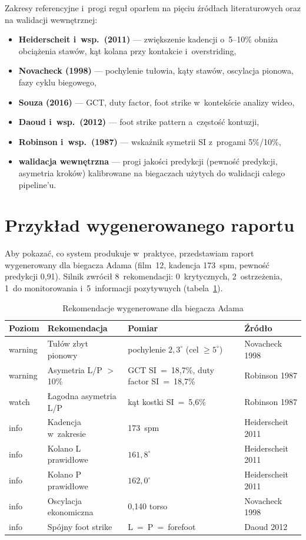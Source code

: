 Zakresy referencyjne i~progi reguł oparłem na pięciu źródłach literaturowych oraz na walidacji wewnętrznej:
\begin{itemize}
    \item \textbf{Heiderscheit i~wsp.\ (2011)} \cite{heiderscheit2011} --- zwiększenie kadencji o~5--10\% obniża obciążenia stawów, kąt kolana przy kontakcie i~overstriding,
    \item \textbf{Novacheck (1998)} \cite{novacheck1998} --- pochylenie tułowia, kąty stawów, oscylacja pionowa, fazy cyklu biegowego,
    \item \textbf{Souza (2016)} \cite{souza2016} --- GCT, duty factor, foot strike w~kontekście analizy wideo,
    \item \textbf{Daoud i~wsp.\ (2012)} \cite{daoud2012} --- foot strike pattern a~częstość kontuzji,
    \item \textbf{Robinson i~wsp.\ (1987)} \cite{robinson1987} --- wskaźnik symetrii SI z~progami 5\%/10\%,
    \item \textbf{walidacja wewnętrzna} --- progi jakości predykcji (pewność predykcji, asymetria kroków) kalibrowane na biegaczach użytych do walidacji całego pipeline'u.
\end{itemize}
\newpage
\section{Przykład wygenerowanego raportu}
\label{sec:rules-example}

Aby pokazać, co system produkuje w~praktyce, przedstawiam raport wygenerowany dla biegacza Adama (film~12, kadencja 173~spm, pewność predykcji 0{,}91). Silnik zwrócił 8~rekomendacji: 0~krytycznych, 2~ostrzeżenia, 1~do monitorowania i~5~informacji pozytywnych (tabela~\ref{tab:rec-example}).

\begin{table}[H]
\centering
\caption{Rekomendacje wygenerowane dla biegacza Adama}
\label{tab:rec-example}
\small
\begin{tabular}{p{1.6cm}p{4.3cm}p{4.2cm}p{2.4cm}}
\hline
\textbf{Poziom} & \textbf{Rekomendacja} & \textbf{Pomiar} & \textbf{Źródło} \\
\hline
warning & Tułów zbyt pionowy & pochylenie $2{,}3^\circ$ (cel $\geq 5^\circ$) & Novacheck 1998 \\
warning & Asymetria L/P $>$10\% & GCT SI~=~18{,}7\%, duty factor SI~=~18{,}7\% & Robinson 1987 \\
watch   & Łagodna asymetria L/P & kąt kostki SI~=~5{,}6\% & Robinson 1987 \\
info    & Kadencja w~zakresie & 173~spm & Heiderscheit 2011 \\
info    & Kolano L prawidłowe & $161{,}8^\circ$ & Heiderscheit 2011 \\
info    & Kolano P prawidłowe & $162{,}0^\circ$ & Heiderscheit 2011 \\
info    & Oscylacja ekonomiczna & 0{,}140 torso & Novacheck 1998 \\
info    & Spójny foot strike & L~=~P~=~forefoot & Daoud 2012 \\
\hline
\end{tabular}
\end{table}

